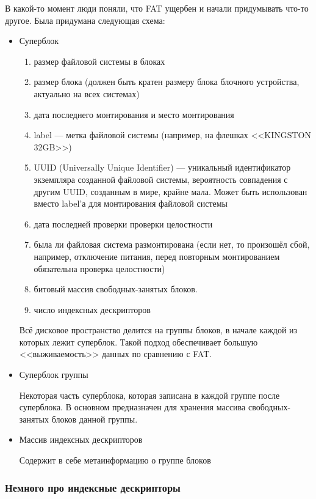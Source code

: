 В какой-то момент люди поняли, что FAT ущербен и начали придумывать что-то другое. Была придумана следующая схема:


\begin{itemize}
\item{Суперблок}

\begin{enumerate}
\item размер файловой системы в блоках
\item размер блока (должен быть кратен размеру блока блочного устройства, актуально на всех системах)
\item дата последнего монтирования и место монтирования
\item label --- метка файловой системы (например, на флешках <<KINGSTON 32GB>>)
\item UUID (Universally Unique Identifier) --- уникальный идентификатор экземпляра созданной файловой системы, вероятность совпадения с другим UUID, созданным в мире, крайне мала. Может быть использован вместо label'а для монтирования файловой системы
\item дата последней проверки проверки целостности
\item была ли файловая система размонтирована (если нет, то произошёл сбой, например, отключение питания, перед повторным монтированием обязательна проверка целостности)
\item битовый массив свободных-занятых блоков.
\item число индексных дескрипторов
\end{enumerate}

Всё дисковое пространство делится на группы блоков, в начале каждой из которых лежит суперблок. Такой подход обеспечивает большую <<выживаемость>> данных по сравнению с FAT.

\item{Суперблок группы}

Некоторая часть суперблока, которая записана в каждой группе после суперблока. В основном предназначен для хранения массива свободных-занятых блоков данной группы.

\item{Массив индексных дескрипторов}

Содержит в себе метаинформацию о группе блоков

\end{itemize}

\subsubsection{Немного про индексные дескрипторы}

